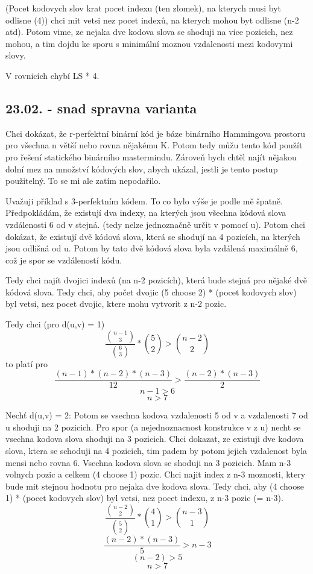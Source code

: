 (Pocet kodovych slov krat pocet indexu (ten zlomek), na kterych musi byt odlisne (4)) chci mit vetsi nez pocet indexů, na kterych mohou byt odlisne (n-2 atd). Potom vime, ze nejaka dve kodova slova se shoduji na vice pozicich, nez mohou, a tim dojdu ke sporu s minimální moznou vzdalenosti mezi kodovymi slovy. 

V rovnicích chybí LS * 4.

\subsection{23.02. - snad spravna varianta}
Chci dokázat, že r-perfektní binární kód je báze binárního Hammingova prostoru pro všechna n větší nebo rovna nějakému K. Potom tedy můžu tento kód použít pro řešení statického binárního mastermindu. Zároveň bych chtěl najít nějakou dolní mez na množství kódových slov, abych ukázal, jestli je tento postup použitelný. To se mi ale zatím nepodařilo.

Uvažuji příklad s 3-perfektním kódem. To co bylo výše je podle mě špatně. Předpokládám, že existují dva indexy, na kterých jsou všechna kódová slova vzdálenosti 6 od v stejná. (tedy nelze jednoznačně určit v pomocí u). Potom chci dokázat, že existují dvě kódová slova, která se shodují na 4 pozicích, na kterých jsou odlišná od u. Potom by tato dvě kódová slova byla vzdálená maximálně 6, což je spor se vzdáleností kódu. 

Tedy chci najít dvojici indexů (na n-2 pozicích), která bude stejná pro nějaké dvě kódová slova. Tedy chci, aby počet dvojic (5 choose 2) * (pocet kodovych slov) byl vetsi, nez pocet dvojic, ktere mohu vytvorit z n-2 pozic. 

Tedy chci (pro d(u,v) = 1)
\[ \frac{\binom{n-1}{3}}{\binom{6}{3}} * \binom{5}{2} > \binom{n-2}{2} \]
to platí pro
\[\frac{(n-1)*(n-2)*(n-3)}{12} > \frac{(n-2)*(n-3)}{2}\]
\[n-1 > 6\]
\[n > 7\]

Nechť d(u,v) = 2:
Potom se vsechna kodova vzdalenosti 5 od v a vzdalenosti 7 od u shoduji na 2 pozicich. Pro spor (a nejednoznacnost konstrukce v z u) necht se vsechna kodova slova shoduji na 3 pozicich. Chci dokazat, ze existuji dve kodova slova, ktera se schoduji na 4 pozicich, tim padem by potom jejich vzdalenost byla mensi nebo rovna 6. Vsechna kodova slova se shoduji na 3 pozicich. Mam n-3 volnych pozic a celkem (4 choose 1) pozic. Chci najit index z n-3 moznosti, ktery bude mit stejnou hodnotu pro nejaka dve kodova slova. Tedy chci, aby (4 choose 1) * (pocet kodovych slov) byl vetsi, nez pocet indexu, z n-3 pozic (= n-3).
\[ \frac{\binom{n-2}{2}}{\binom{5}{2}} * \binom{4}{1} > \binom{n-3}{1} \]
\[ \frac{(n-2)*(n-3)}{5} > n-3 \]
\[ (n-2) > 5 \]
\[n > 7\]

